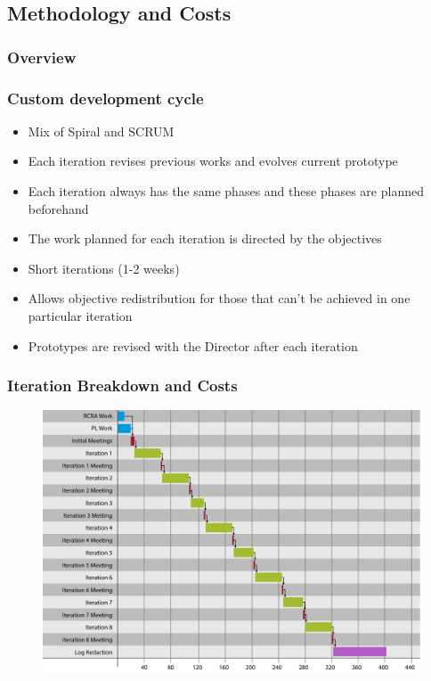 \documentclass[english,handout]{beamer}
\begin{document}
\subsection{Methodology and Costs}
\begin{frame}
	\frametitle{Overview}
\end{frame}
	\begin{frame}
		\frametitle{Custom development cycle}
			\begin{itemize}
			 \item Mix of Spiral and SCRUM
			 \item Each iteration revises previous works and \alert{evolves current prototype}
			 \item Each iteration always has the same phases and these phases are planned beforehand
			 \item The work planned for each iteration is \alert{directed by the objectives}
			 \item Short iterations (1-2 weeks)
			 \item Allows \alert{objective redistribution} for those that can't be achieved in one particular iteration
			 \item Prototypes are revised with the Director after each iteration
			\end{itemize}
	\end{frame}
	\begin{frame}
		\frametitle{Iteration Breakdown and Costs}
		\begin{figure}
		\centering
		\includegraphics[width=0.7\linewidth]{imagenes/diagrama_tareas.pdf}
		\end{figure}
		
				\begin{table}
				\centering
				\end{table}
	\end{frame}
\end{document}
